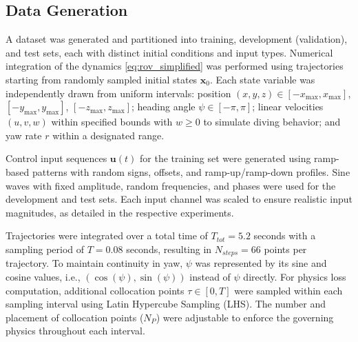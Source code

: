 \subsection{Data Generation}
A dataset was generated and partitioned into training, development (validation), and test sets, each with distinct initial conditions and input types. Numerical integration of the dynamics \eqref{eq:rov_simplified} was performed using trajectories starting from randomly sampled initial states $\bm{x}_0$. Each state variable was independently drawn from uniform intervals: position $(x, y, z) \in [-x_{\max}, x_{\max}]$, $[-y_{\max}, y_{\max}]$, $[-z_{\max}, z_{\max}]$; heading angle $\psi \in [-\pi, \pi]$; linear velocities $(u, v, w)$ within specified bounds with $w \geq 0$ to simulate diving behavior; and yaw rate $r$ within a designated range.

Control input sequences $\mathbf{u}(t)$ for the training set were generated using ramp-based patterns with random signs, offsets, and ramp-up/ramp-down profiles. Sine waves with fixed amplitude, random frequencies, and phases were used for the development and test sets. Each input channel was scaled to ensure realistic input magnitudes, as detailed in the respective experiments.

Trajectories were integrated over a total time of $T_{tot}=5.2$ seconds with a sampling period of $T=0.08$ seconds, resulting in $N_{steps}=66$ points per trajectory. To maintain continuity in yaw, $\psi$ was represented by its sine and cosine values, i.e., $(\cos(\psi), \sin(\psi))$ instead of $\psi$ directly. For physics loss computation, additional collocation points $\tau \in [0, T]$ were sampled within each sampling interval using Latin Hypercube Sampling (LHS). The number and placement of collocation points ($N_P$) were adjustable to enforce the governing physics throughout each interval.

